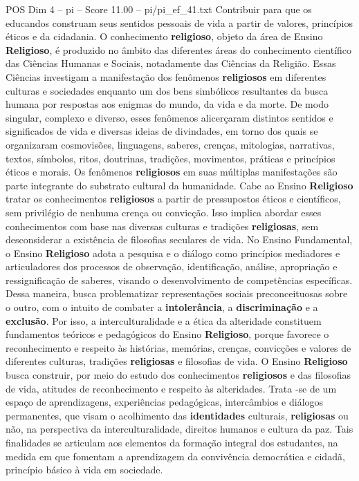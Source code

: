 \begin{textsample}{POS Dim 4 – pi – Score 11.00 – pi/pi\_ef\_41.txt}
Contribuir para que os educandos construam seus sentidos pessoais de vida a partir de valores, princípios éticos e da cidadania.
O conhecimento \textbf{religioso}, objeto da área de Ensino \textbf{Religioso}, é produzido no âmbito das diferentes áreas do conhecimento científico das Ciências Humanas e Sociais, notadamente das Ciências da Religião.
Essas Ciências investigam a manifestação dos fenômenos \textbf{religiosos} em diferentes culturas e sociedades enquanto um dos bens simbólicos resultantes da busca humana por respostas aos enigmas do mundo, da vida e da morte.
De modo singular, complexo e diverso, esses fenômenos alicerçaram distintos sentidos e significados de vida e diversas ideias de divindades, em torno dos quais se organizaram cosmovisões, linguagens, saberes, crenças, mitologias, narrativas, textos, símbolos, ritos, doutrinas, tradições, movimentos, práticas e princípios éticos e morais.
Os fenômenos \textbf{religiosos} em suas múltiplas manifestações são parte integrante do substrato cultural da humanidade.
Cabe ao Ensino \textbf{Religioso} tratar os conhecimentos \textbf{religiosos} a partir de pressupostos éticos e científicos, sem privilégio de nenhuma crença ou convicção.
Isso implica abordar esses conhecimentos com base nas diversas culturas e tradições \textbf{religiosas}, sem desconsiderar a existência de filosofias seculares de vida.
No Ensino Fundamental, o Ensino \textbf{Religioso} adota a pesquisa e o diálogo como princípios mediadores e articuladores dos processos de observação, identificação, análise, apropriação e ressignificação de saberes, visando o desenvolvimento de competências específicas.
Dessa maneira, busca problematizar representações sociais preconceituosas sobre o outro, com o intuito de combater a \textbf{intolerância}, a \textbf{discriminação} e a \textbf{exclusão}.
Por isso, a interculturalidade e a ética da alteridade constituem fundamentos teóricos e pedagógicos do Ensino \textbf{Religioso}, porque favorece o reconhecimento e respeito às histórias, memórias, crenças, convicções e valores de diferentes culturas, tradições \textbf{religiosas} e filosofias de vida.
O Ensino \textbf{Religioso} busca construir, por meio do estudo dos conhecimentos \textbf{religiosos} e das filosofias de vida, atitudes de reconhecimento e respeito às alteridades.
Trata -se de um espaço de aprendizagens, experiências pedagógicas, intercâmbios e diálogos permanentes, que visam o acolhimento das \textbf{identidades} culturais, \textbf{religiosas} ou não, na perspectiva da interculturalidade, direitos humanos e cultura da paz.
Tais finalidades se articulam aos elementos da formação integral dos estudantes, na medida em que fomentam a aprendizagem da convivência democrática e cidadã, princípio básico à vida em sociedade.

\end{textsample}
